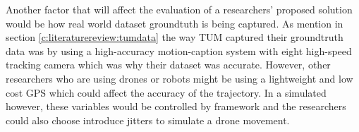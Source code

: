 Another factor that will affect the evaluation of a researchers' proposed solution would be how real world dataset groundtuth is being captured. As mention in section \ref{c:literaturereview:tumdata} the way TUM captured their groundtruth data was by using a high-accuracy motion-caption system with eight high-speed tracking camera which was why their dataset was accurate. However, other researchers who are using drones or robots might be using a lightweight and low cost GPS which could affect the accuracy of the trajectory. In a simulated however, these variables would be controlled by framework and the researchers could also choose introduce jitters to simulate a drone movement.